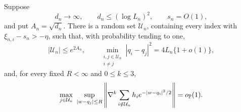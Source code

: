 \begin{lemma}
\label{lem:slow-punctured-c3}
Suppose
\[
 d_n\longrightarrow\infty,\qquad
 d_n\le(\log L_n)^2,\qquad s_n=O(1),
\]
and put \(A_n=\sqrt{d_n}\).  There is a random set
\(\mathcal U_n\), containing every index with
\(\xi_{n,i}-s_n>-\eta\), such that, with probability tending to one,
\[
 |\mathcal U_n|\le e^{2A_n},\qquad
 \min_{\substack{i,j\in\mathcal U_n\\i\ne j}}
 |q_i-q_j|^2=4L_n\{1+o(1)\},
\]
and, for every fixed \(R<\infty\) and \(0\le k\le3\),
\begin{equation}
\label{eq:slow-punctured-c3}
 \max_{j\in\mathcal U_n}\ \sup_{|w-q_j|\le R}
 \left\|
  \nabla^k\sum_{i\notin\mathcal U_n}
  h_ie^{-|w-q_i|^2/2}
 \right\|=o_{\mathbb P}(1).
\end{equation}
\end{lemma}

